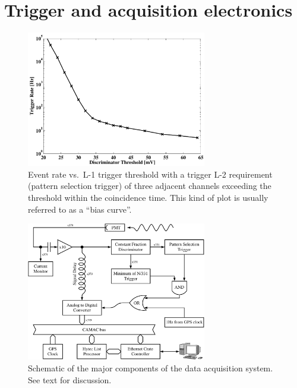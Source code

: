 \section{Trigger and acquisition electronics}
\label{SEC::TECHNIQUE::ELECTRONICS}

\begin{figure}[p]
\centerline{\includegraphics[angle=270,width=0.7\textwidth]{plots/chap-technique/bias_011009.pdf}}
\caption{\label{FIG::TECHNIQUE::BIASCURVE} Event rate vs.\ L-1
trigger threshold with a trigger L-2 requirement (pattern selection
trigger) of three adjacent channels exceeding the threshold within the
coincidence time. This kind of plot is usually referred to as a ``bias
curve''.}
\end{figure}

\begin{figure}[p]
\centerline{\includegraphics[width=0.7\textwidth]{plots/chap-technique/el_schematic.pdf}}
\caption{\label{FIG::TECHNIQUE::ELSCHEMATIC} Schematic of the major
components of the data acquisition system. See text for discussion.}
\end{figure}

